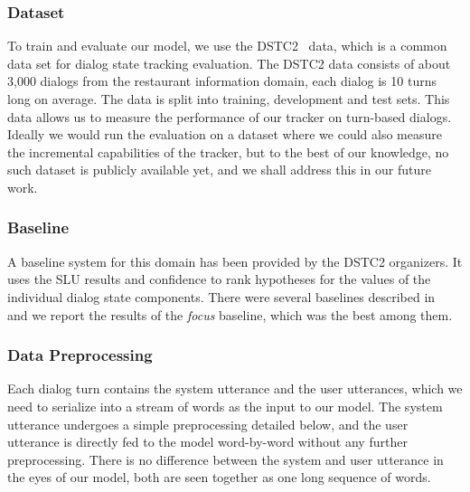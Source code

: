 \documentclass[runningheads,a4paper]{llncs}
\begin{document}
\subsubsection{Dataset}
To train and evaluate our model, we use the DSTC2~\cite{henderson2014second} data, which is a common data set for dialog state tracking evaluation. The DSTC2 data consists of about 3,000 dialogs from the restaurant information domain, each dialog is 10 turns long on average. The data is split into training, development and test sets. This data allows us to measure the performance of our tracker on turn-based dialogs. Ideally we would run the evaluation on a dataset where we could also measure the incremental capabilities of the tracker, but to the best of our knowledge, no such dataset is publicly available yet, and we shall address this in our future work.

\subsubsection{Baseline}
A baseline system for this domain has been provided by the DSTC2 organizers. It uses the SLU results and confidence to rank hypotheses for the values of the individual dialog state components. There were several baselines described in~\cite{henderson2014second} and we report the results of the \emph{focus} baseline, which was the best among them.

\subsubsection{Data Preprocessing}
Each dialog turn contains the system utterance and the user utterances, which we need to serialize into a stream of words as the input to our model. The system utterance undergoes a simple preprocessing detailed below, and the user utterance is directly fed to the model word-by-word without any further preprocessing. There is no difference between the system and user utterance in the eyes of our model, both are seen together as one long sequence of words.
\end{document}

